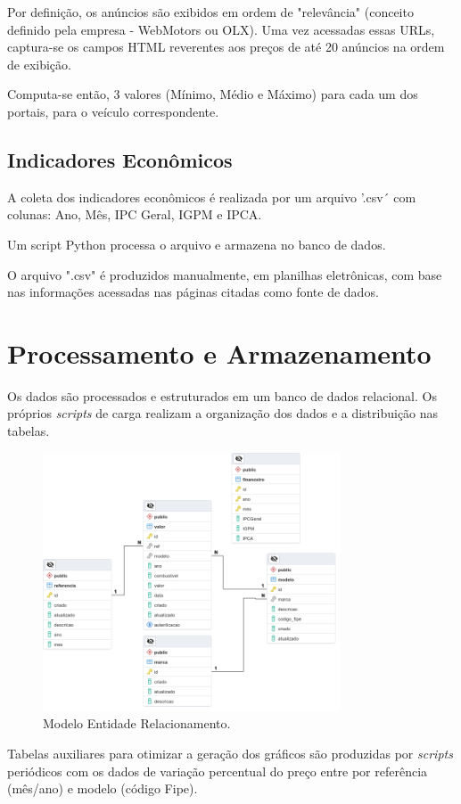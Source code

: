\documentclass[conference]{IEEEtran}
\begin{document}
Por definição, os anúncios são exibidos em ordem de "relevância" (conceito definido pela empresa - WebMotors ou OLX). Uma vez acessadas essas URLs, captura-se os campos HTML reverentes aos preços de até 20 anúncios na ordem de exibição.

Computa-se então, 3 valores (Mínimo, Médio e Máximo) para cada um dos portais, para o veículo correspondente.

\subsection{Indicadores Econômicos}

A coleta dos indicadores econômicos é realizada por um arquivo '.csv´ com colunas: Ano, Mês, IPC Geral, IGPM e IPCA.
 
Um script Python processa o arquivo e armazena no banco de dados.

O arquivo ".csv" é produzidos manualmente, em planilhas eletrônicas, com base nas informações acessadas nas páginas citadas como fonte de dados.

\section{Processamento e Armazenamento}

Os dados são processados e estruturados em um banco de dados relacional. Os próprios \textit{scripts} de carga realizam a organização dos dados e a distribuição nas tabelas.


\begin{figure}[htbp]
	\centerline{\includegraphics[width=250pt]{assets/database.png}}
	\caption{Modelo Entidade Relacionamento.}
	\label{fig1}
\end{figure}

Tabelas auxiliares para otimizar a geração dos gráficos são produzidas por \textit{scripts} periódicos com os dados de variação percentual do preço entre por referência (mês/ano) e modelo (código Fipe).
\end{document}
